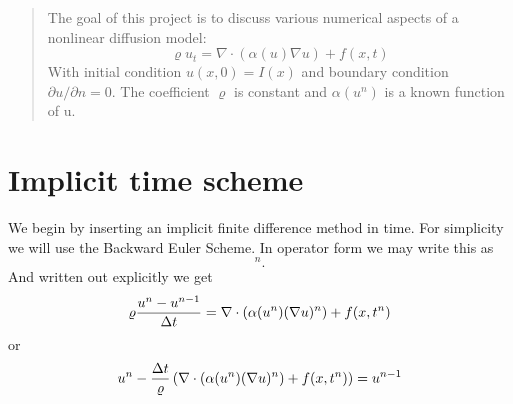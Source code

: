 \documentclass[12pt]{article}
\date{\today}
\newcommand{\beq}{\begin{equation}}
\newcommand{\eeq}{\end{equation}}
\begin{document}
 \maketitle
 \begin{abstract}
  The goal of this project is to discuss various numerical aspects of a nonlinear diffusion model: 
  \begin{equation} \label{eq:master}
    \varrho u_t = \nabla \cdot (\alpha(u) \nabla u) + f(x,t)
  \end{equation}
  With initial condition $u(x,0) = I(x)$ and boundary condition $\partial u / \partial n = 0$. The coefficient $\varrho$ is constant and $\alpha(u^n)$ is a known function of u.
 \end{abstract}
 
 \section{Implicit time scheme}
 We begin by inserting an implicit finite difference method in time. For simplicity we will use the Backward Euler Scheme. In operator form we may write this as 
 \beq
 [\varrho D_t^⁻ u = \nabla \cdot (\alpha(u) \nabla u) + f(x,t)]^n.
 \eeq
 And written out explicitly we get
 \begin{equation}
  \varrho{ u^n - u^{n-1} \over \Delta t } = \nabla \cdot (\alpha(u^n) (\nabla u)^n) + f(x,t^n)
 \end{equation}
 or 
 \begin{equation}
   u^n - {\Delta t \over \varrho}\left(\nabla \cdot (\alpha(u^n) (\nabla u)^n) + f(x,t^n) \right) = u^{n-1}
 \end{equation}
 
\end{document}
